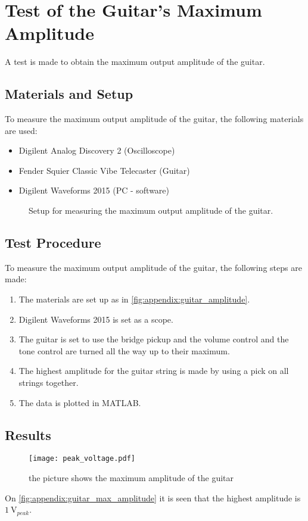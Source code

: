\chapter{Test of the Guitar's Maximum Amplitude}\label{app:guitar_max_amplitude}

A test is made to obtain the maximum output amplitude of the guitar.

\section*{Materials and Setup}
To measure the maximum output amplitude of the guitar, the following materials are used:
\begin{itemize}
\item Digilent Analog Discovery 2 (Oscilloscope)
\item Fender Squier Classic Vibe Telecaster (Guitar)
\item Digilent Waveforms 2015 (PC - software)
\end{itemize}

\begin{figure}[htbp!]
\centering
\def\svgwidth{\columnwidth}

\caption{Setup for measuring the maximum output amplitude of the guitar.}
		\label{fig:appendix:guitar_amplitude}
\end{figure}

\section*{Test Procedure}
To measure the maximum output amplitude of the guitar, the following steps are made:
\begin{enumerate}
\item The materials are set up as in \autoref{fig:appendix:guitar_amplitude}.
\item Digilent Waveforms 2015 is set as a scope. 
\item The guitar is set to use the bridge pickup and the volume control and the tone control are turned all the way up to their maximum.
\item The highest amplitude for the guitar string is made by using a pick on all strings together.
\item The data is plotted in MATLAB.
\end{enumerate}

\section*{Results}

\begin{figure}[htbp!]
	\centering
		\texttt{[image: peak\_voltage.pdf]}
		\caption{the picture shows the maximum amplitude of the guitar}
		\label{fig:appendix:guitar_max_amplitude}
\end{figure}

On  \autoref{fig:appendix:guitar_max_amplitude} it is seen that the highest amplitude is $\SI{1}{\volt}_{peak}$.
